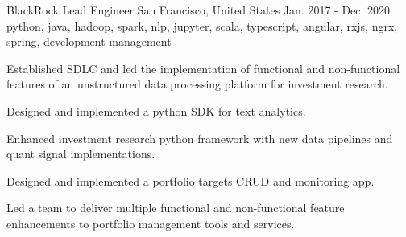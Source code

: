 \cventry
    {BlackRock} %
    {Lead Engineer} %
    {San Francisco, United States} %
    {Jan. 2017 - Dec. 2020} %
    { python, java, hadoop, spark, nlp, jupyter, scala, typescript, angular, rxjs, ngrx, spring, development-management} %
    {
    \begin{cvitems} %
        \item { Established SDLC and led the implementation of functional and non-functional features of an unstructured data processing platform for investment research.  }
        \item { Designed and implemented a python SDK for text analytics. }
        \item { Enhanced investment research python framework with new data pipelines and quant signal implementations. }
        \item { Designed and implemented a portfolio targets CRUD and monitoring app. }
        \item { Led a team to deliver multiple functional and non-functional feature enhancements to portfolio management tools and services. }
    \end{cvitems}
    }





